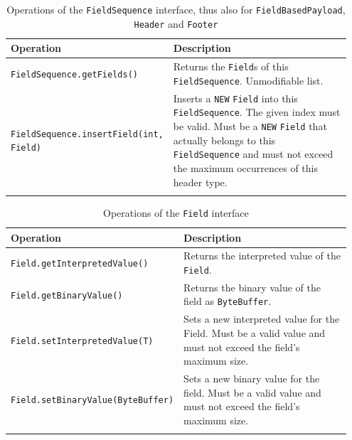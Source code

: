 \small
\begin{landscape}
\begin{longtable}{|p{0.3\linewidth}|p{0.65\linewidth}|}
\hline
\rowcolor[gray]{.9}\textbf{Operation} & \textbf{Description} \\
\endhead
\hline
\texttt{FieldSequence}\linebreak\texttt{.getFields()} & Returns the \texttt{Field}s of this \texttt{FieldSequence}. Unmodifiable list. \\
\hline
\texttt{FieldSequence}\linebreak\texttt{.insertField(int, Field)} & Inserts a \texttt{NEW} \texttt{Field} into this \texttt{FieldSequence}. The given index must be valid. Must be a \texttt{NEW} \texttt{Field} that actually belongs to this \texttt{FieldSequence} and must not exceed the maximum occurrences of this header type. \\
\hline
\caption{Operations of the \texttt{FieldSequence} interface, thus also for \texttt{FieldBasedPayload}, \texttt{Header} and \texttt{Footer}}
\label{tab:DBOpsFieldSequence}
\end{longtable}
\end{landscape}
\normalsize

\small
\begin{landscape}
\begin{longtable}{|p{0.35\linewidth}|p{0.6\linewidth}|}
\hline
\rowcolor[gray]{.9}\textbf{Operation} & \textbf{Description} \\
\endhead
\hline
\texttt{Field}\linebreak\texttt{.getInterpretedValue()} & Returns the interpreted value of the \texttt{Field}. \\
\hline
\texttt{Field}\linebreak\texttt{.getBinaryValue()} & Returns the binary value of the field as \texttt{ByteBuffer}. \\
\hline
\texttt{Field}\linebreak\texttt{.setInterpretedValue(T)} & Sets a new interpreted value for the Field. Must be a valid value and must not exceed the field's maximum size. \\
\hline
\texttt{Field}\linebreak\texttt{.setBinaryValue(ByteBuffer)} & Sets a new binary value for the field. Must be a valid value and must not exceed the field's maximum size. \\
\hline
\caption{Operations of the \texttt{Field} interface}
\label{tab:DBOpsField}
\end{longtable}
\end{landscape}
\normalsize

